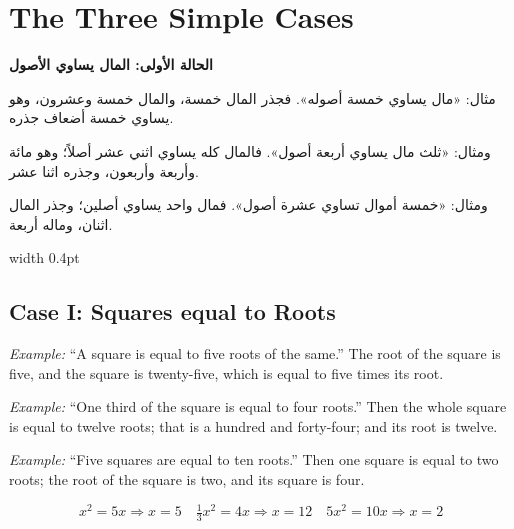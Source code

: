 \documentclass[11pt,a4paper,openany,oneside]{book}
\begin{document}
\newpage

\section{The Three Simple Cases}

\noindent\begin{minipage}[t]{0.48\textwidth}
\raggedleft

\begin{Arabic}
\textbf{الحالة الأولى: المال يساوي الأصول}

مثال: «مال يساوي خمسة أصوله». فجذر المال خمسة، والمال خمسة وعشرون، وهو يساوي خمسة أضعاف جذره.

ومثال: «ثلث مال يساوي أربعة أصول». فالمال كله يساوي اثني عشر أصلاً؛ وهو مائة وأربعة وأربعون، وجذره اثنا عشر.

ومثال: «خمسة أموال تساوي عشرة أصول». فمال واحد يساوي أصلين؛ وجذر المال اثنان، وماله أربعة.
\end{Arabic}

\end{minipage}%
\hfill\vrule width 0.4pt\hfill
\begin{minipage}[t]{0.48\textwidth}
\raggedright

\subsection*{Case I: Squares equal to Roots}

\textit{Example:} ``A square is equal to five roots of the same.'' The root of the square is five, and the square is twenty-five, which is equal to five times its root.

\textit{Example:} ``One third of the square is equal to four roots.'' Then the whole square is equal to twelve roots; that is a hundred and forty-four; and its root is twelve.

\textit{Example:} ``Five squares are equal to ten roots.'' Then one square is equal to two roots; the root of the square is two, and its square is four.

\begin{equation}
\boxed{x^2 = 5x \Rightarrow x = 5} \quad
\boxed{\tfrac{1}{3}x^2 = 4x \Rightarrow x = 12} \quad
\boxed{5x^2 = 10x \Rightarrow x = 2}
\end{equation}

\end{minipage}
\vspace{0.3cm}
\end{document}
